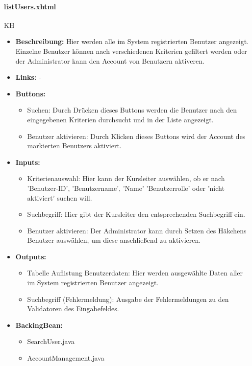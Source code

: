 				\paragraph{listUsers.xhtml}
					KH\\
					\begin{itemize}
						\item \textbf{Beschreibung:} Hier werden alle im System registrierten Benutzer angezeigt. Einzelne Benutzer können nach verschiedenen Kriterien gefiltert werden oder der Administrator kann den Account von Benutzern aktiveren. 
						\item \textbf{Links:} -
						\item \textbf{Buttons:}
							\begin{itemize}
								\item Suchen: Durch Drücken dieses Buttons werden die Benutzer nach den eingegebenen Kriterien durchsucht und in der Liste angezeigt.
								\item Benutzer aktivieren: Durch Klicken dieses Buttons wird der Account des markierten Benutzers aktiviert.
							\end{itemize}
						\item \textbf{Inputs:}
							\begin{itemize}
								\item Kriterienauswahl: Hier kann der Kursleiter auswählen, ob er nach 'Benutzer-ID', 'Benutzername', 'Name' 'Benutzerrolle' oder 'nicht aktiviert' suchen will.
								\item Suchbegriff: Hier gibt der Kursleiter den entsprechenden Suchbegriff ein.
								\item Benutzer aktivieren: Der Administrator kann durch Setzen des Häkchens Benutzer auswählen, um diese anschließend zu aktivieren.
							\end{itemize}
						\item \textbf{Outputs:}
							\begin{itemize}
								\item Tabelle Auflistung Benutzerdaten: Hier werden ausgewählte Daten aller im System registrierten Benutzer angezeigt.
								\item Suchbegriff (Fehlermeldung): Ausgabe der Fehlermeldungen zu den Validatoren des Eingabefeldes.
							\end{itemize}
						\item \textbf{BackingBean:}
							\begin{itemize}
								\item SearchUser.java
								\item AccountManagement.java
							\end{itemize}
					\end{itemize}
			
